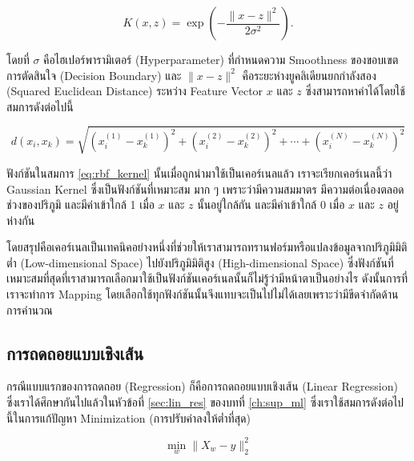 \begin{equation}\label{eq:rbf_kernel}
    K(x,z) = \exp\left(-\frac{\lVert x - z \rVert^2}{2\sigma^2}\right).    
\end{equation}

\noindent โดยที่ $\sigma$ คือไฮเปอร์พารามิเตอร์ (Hyperparameter) ที่กำหนดความ Smoothness ของขอบเขตการตัดสินใจ (Decision 
Boundary) และ $\lVert x - z \rVert^2$ คือระยะห่างยูคลิเดียนยกกำลังสอง (Squared Euclidean Distance) ระหว่าง Feature 
Vector $x$ และ $z$ ซึ่งสามารถหาค่าได้โดยใช้สมการดังต่อไปนี้

\begin{equation}
    d(x_{i}, x_{k}) = 
    \sqrt{(x^{(1)}_{i} - x^{(1)}_{k})^{2} + (x^{(2)}_{i} - x^{(2)}_{k})^{2} + \cdots + 
    (x^{(N)}_{i} - x^{(N)}_{k})^{2}}
\end{equation}

ฟังก์ชันในสมการ \ref{eq:rbf_kernel} นั้นเมื่อถูกนำมาใช้เป็นเคอร์เนลแล้ว เราจะเรียกเคอร์เนลนี้ว่า Gaussian Kernel ซึ่งเป็นฟังก์ชันที่เหมาะสม%
มาก ๆ เพราะว่ามีความสมมาตร มีความต่อเนื่องตลอดช่วงของปริภูมิ และมีค่าเข้าใกล้ 1 เมื่อ $x$ และ $z$ นั้นอยู่ใกล้กัน และมีค่าเข้าใกล้ 0 เมื่อ 
$x$ และ $z$ อยู่ห่างกัน

 โดยสรุปคือเคอร์เนลเป็นเทคนิคอย่างหนึ่งที่ช่วยให้เราสามารถทรานฟอร์มหรือแปลงข้อมูลจากปริภูมิมิติต่ำ (Low-dimensional Space) ไปยังปริภูมิมิติสูง
 (High-dimensional Space) ซึ่งฟังก์ชันที่เหมาะสมที่สุดที่เราสามารถเลือกมาใช้เป็นฟังก์ชันเคอร์เนลนั้นก็ไม่รู้ว่ามีหน้าตาเป็นอย่างไร ดังนั้นการที่%
 เราจะทำการ Mapping โดยเลือกใช้ทุกฟังก์ชันนั้นจึงแทบจะเป็นไปไม่ได้เลยเพราะว่ามีขีดจำกัดด้านการคำนวณ

\subsection{การถดถอยแบบเชิงเส้น}

กรณีแบบแรกของการถดถอย (Regression) ก็คือการถดถอยแบบเชิงเส้น (Linear Regression) ซึ่งเราได้ศึกษากันไปแล้วในหัวข้อที่ 
\ref{sec:lin_res} ของบทที่ \ref{ch:sup_ml} ซึ่งเราใช้สมการดังต่อไปนี้ในการแก้ปัญหา Minimization (การปรับค่าลงให้ต่ำที่สุด)

\begin{equation}
    \min_{w} \lVert X_{w} - y \rVert_{2}^{2}
\end{equation}

